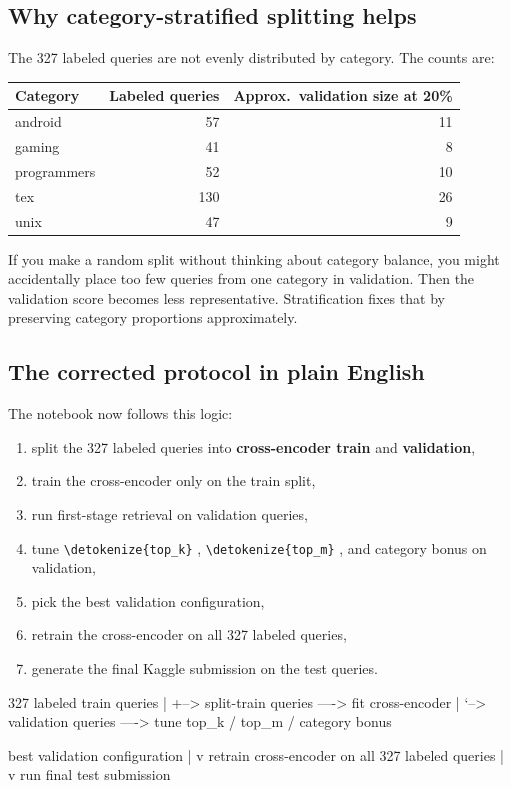 \documentclass[10pt]{article}
\DeclareRobustCommand{\code}[1]{%
  \ifmmode
    \text{\nolinkurl{\detokenize{#1}}}%
  \else
    \nolinkurl{\detokenize{#1}}%
  \fi
}
\begin{document}
\subsection{Why category-stratified splitting helps}

The 327 labeled queries are not evenly distributed by category. The counts are:
\begin{center}
\begin{tabular}{@{}lrr@{}}
\toprule
Category & Labeled queries & Approx.\ validation size at 20\% \\
\midrule
android & 57 & 11 \\
gaming & 41 & 8 \\
programmers & 52 & 10 \\
tex & 130 & 26 \\
unix & 47 & 9 \\
\bottomrule
\end{tabular}
\end{center}

If you make a random split without thinking about category balance, you might accidentally place too few queries from one category in validation. Then the validation score becomes less representative. Stratification fixes that by preserving category proportions approximately.

\subsection{The corrected protocol in plain English}

The notebook now follows this logic:
\begin{enumerate}
    \item split the 327 labeled queries into \textbf{cross-encoder train} and \textbf{validation},
    \item train the cross-encoder only on the train split,
    \item run first-stage retrieval on validation queries,
    \item tune \code{top_k}, \code{top_m}, and category bonus on validation,
    \item pick the best validation configuration,
    \item retrain the cross-encoder on all 327 labeled queries,
    \item generate the final Kaggle submission on the test queries.
\end{enumerate}

\begin{asciibox}[title={Leakage-safe protocol}]
327 labeled train queries
  |
  +--> split-train queries ----> fit cross-encoder
  |
  `--> validation queries ----> tune top_k / top_m / category bonus

best validation configuration
  |
  v
retrain cross-encoder on all 327 labeled queries
  |
  v
run final test submission
\end{asciibox}
\end{document}
